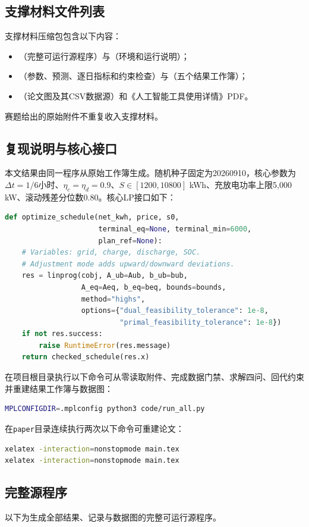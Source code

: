 \subsection*{支撑材料文件列表}
支撑材料压缩包包含以下内容：
\begin{itemize}
\item {}（完整可运行源程序）与（环境和运行说明）；
\item {}（参数、预测、逐日指标和约束检查）与（五个结果工作簿）；
\item {}（论文图及其CSV数据源）和《人工智能工具使用详情》PDF。
\end{itemize}
赛题给出的原始附件不重复收入支撑材料。

\subsection*{复现说明与核心接口}
本文结果由同一程序从原始工作簿生成。随机种子固定为20260910，核心参数为$\Delta t=1/6$小时、$\eta_c=\eta_d=0.9$、$S\in[1200,10800]$ kWh、充放电功率上限5,000 kW、滚动残差分位数0.80。核心LP接口如下：
\begin{lstlisting}[language=Python]
def optimize_schedule(net_kwh, price, s0,
                      terminal_eq=None, terminal_min=6000,
                      plan_ref=None):
    # Variables: grid, charge, discharge, SOC.
    # Adjustment mode adds upward/downward deviations.
    res = linprog(cobj, A_ub=Aub, b_ub=bub,
                  A_eq=Aeq, b_eq=beq, bounds=bounds,
                  method="highs",
                  options={"dual_feasibility_tolerance": 1e-8,
                           "primal_feasibility_tolerance": 1e-8})
    if not res.success:
        raise RuntimeError(res.message)
    return checked_schedule(res.x)
\end{lstlisting}
在项目根目录执行以下命令可从零读取附件、完成数据门禁、求解四问、回代约束并重建结果工作簿与数据图：
\begin{lstlisting}[language=bash]
MPLCONFIGDIR=.mplconfig python3 code/run_all.py
\end{lstlisting}
在\texttt{paper}目录连续执行两次以下命令可重建论文：
\begin{lstlisting}[language=bash]
xelatex -interaction=nonstopmode main.tex
xelatex -interaction=nonstopmode main.tex
\end{lstlisting}

\subsection*{完整源程序}
以下为生成全部结果、记录与数据图的完整可运行源程序。

